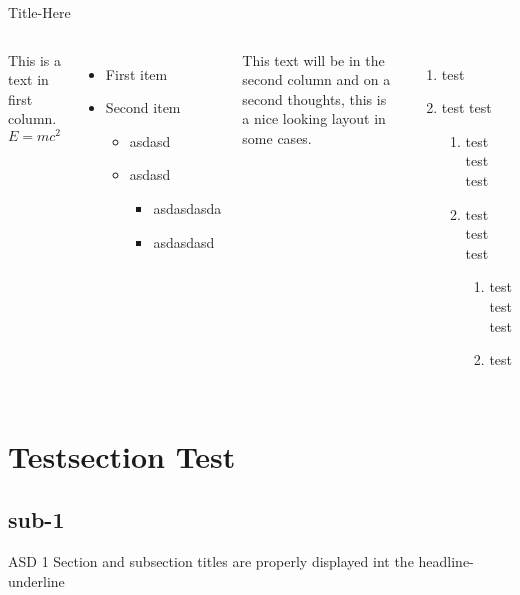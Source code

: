 \documentclass[aspectratio=169]{beamer}
\begin{document}
\begin{frame}{Title-Here}
    \begin{columns}
            This is a text in first column.
            $$E=mc^2$$
            \begin{itemize}
                \item First item
                \item Second item
                \begin{itemize}
                    \item asdasd
                    \item asdasd
                    \begin{itemize}
                        \item asdasdasda
                        \item asdasdasd
                    \end{itemize}
                \end{itemize}
            \end{itemize}
        
            This text will be in the second column
            and on a second thoughts, this is a nice looking
            layout in some cases.
            \begin{enumerate}
                \item test
                \item test test
                \begin{enumerate}
                    \item test test test
                    \item test test test
                    \begin{enumerate}
                        \item test test test
                        \item test
                    \end{enumerate}
                \end{enumerate}
            \end{enumerate}
    \end{columns}
\end{frame}

\section{Testsection Test}
\subsection{sub-1}
\begin{frame}[t]{ASD 1}
    Section and subsection titles are properly displayed int the headline-underline
\end{frame}
\end{document}
